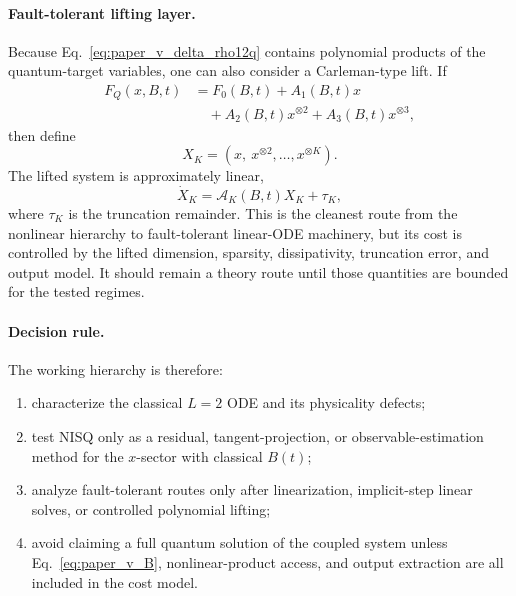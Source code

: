 \documentclass[
  reprint,
  amsmath,
  amssymb,
  aps,
  pra,
  nofootinbib,
  superscriptaddress,
  floatfix
]{revtex4-2}
\begin{document}
\paragraph*{Fault-tolerant lifting layer.}
Because Eq.~\eqref{eq:paper_v_delta_rho12q} contains polynomial products of
the quantum-target variables, one can also consider a Carleman-type lift.  If
\begin{equation}
\begin{aligned}
F_Q(x,B,t)
&=F_0(B,t)+A_1(B,t)x
\\
&\quad
+A_2(B,t)x^{\otimes2}
+A_3(B,t)x^{\otimes3},
\end{aligned}
\end{equation}
then define
\begin{equation}
X_K=\left(x,\ x^{\otimes2},\ldots,x^{\otimes K}\right).
\end{equation}
The lifted system is approximately linear,
\begin{equation}
\dot X_K=\mathcal A_K(B,t)X_K+\tau_K ,
\end{equation}
where \(\tau_K\) is the truncation remainder.  This is the cleanest route from
the nonlinear hierarchy to fault-tolerant linear-ODE machinery, but its cost is
controlled by the lifted dimension, sparsity, dissipativity, truncation error,
and output model.  It should remain a theory route until those quantities are
bounded for the tested regimes.

\paragraph*{Decision rule.}
The working hierarchy is therefore:
\begin{enumerate}
\item characterize the classical \(L=2\) ODE and its physicality defects;
\item test NISQ only as a residual, tangent-projection, or observable-estimation
method for the \(x\)-sector with classical \(B(t)\);
\item analyze fault-tolerant routes only after linearization, implicit-step
linear solves, or controlled polynomial lifting;
\item avoid claiming a full quantum solution of the coupled system unless
Eq.~\eqref{eq:paper_v_B}, nonlinear-product access, and output extraction are
all included in the cost model.
\end{enumerate}
\end{document}
